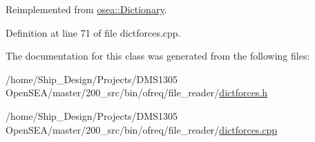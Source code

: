Reimplemented from \hyperlink{classosea_1_1_dictionary_ae96470181c8b1762204493fa45e96d7c}{osea\-::\-Dictionary}.



Definition at line 71 of file dictforces.\-cpp.



The documentation for this class was generated from the following files\-:\begin{DoxyCompactItemize}
\item 
/home/\-Ship\-\_\-\-Design/\-Projects/\-D\-M\-S1305 Open\-S\-E\-A/master/200\-\_\-src/bin/ofreq/file\-\_\-reader/\hyperlink{dictforces_8h}{dictforces.\-h}\item 
/home/\-Ship\-\_\-\-Design/\-Projects/\-D\-M\-S1305 Open\-S\-E\-A/master/200\-\_\-src/bin/ofreq/file\-\_\-reader/\hyperlink{dictforces_8cpp}{dictforces.\-cpp}\end{DoxyCompactItemize}
